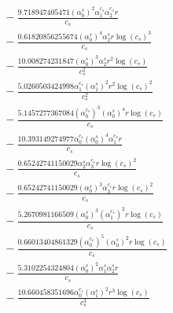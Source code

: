 \documentclass[10pt]{article}
\begin{document}
\begin{align*}
&{}  - \frac{9.718947405471 \left(\alpha_{0}^s\right)^{2} \alpha_{1}^{c_s} \alpha_{2}^{c_s} r}{c_{s}} \\
&{}  - \frac{0.61820856255674 \left(\alpha_{0}^s\right)^{4} \alpha_{2}^s r \log{\left(c_{s} \right)}^{3}}{c_{s}} \\
&{}  - \frac{10.008274231847 \left(\alpha_{0}^s\right)^{3} \alpha_{2}^s r^{2} \log{\left(c_{s} \right)}}{c_{s}^{2}} \\
&{}  - \frac{5.0260503424998 \alpha_{1}^{c_s} \left(\alpha_{1}^s\right)^{2} r^{2} \log{\left(c_{s} \right)}^{2}}{c_{s}^{2}} \\
&{}  - \frac{5.1457277367084 \left(\alpha_{0}^{c_s}\right)^{3} \left(\alpha_{0}^s\right)^{4} r \log{\left(c_{s} \right)}}{c_{s}} \\
&{}  - \frac{10.393149274977 \alpha_{0}^{c_s} \left(\alpha_{0}^s\right)^{4} \alpha_{1}^{c_s} r}{c_{s}} \\
&{}  - \frac{0.65242741150029 \alpha_{2}^s \alpha_{3}^{c_s} r \log{\left(c_{s} \right)}^{2}}{c_{s}} \\
&{}  - \frac{0.65242741150029 \left(\alpha_{0}^s\right)^{3} \alpha_{3}^{c_s} r \log{\left(c_{s} \right)}^{2}}{c_{s}} \\
&{}  - \frac{5.2670981166509 \left(\alpha_{0}^s\right)^{3} \left(\alpha_{1}^{c_s}\right)^{2} r \log{\left(c_{s} \right)}}{c_{s}} \\
&{}  - \frac{0.66013404861329 \left(\alpha_{0}^{c_s}\right)^{5} \left(\alpha_{0}^s\right)^{2} r \log{\left(c_{s} \right)}}{c_{s}} \\
&{}  - \frac{5.3102254324804 \left(\alpha_{0}^s\right)^{2} \alpha_{1}^s \alpha_{2}^s r}{c_{s}} \\
&{}  - \frac{10.660458351696 \alpha_{0}^{c_s} \left(\alpha_{1}^s\right)^{2} r^{3} \log{\left(c_{s} \right)}}{c_{s}^{3}}
\end{align*}
\end{document}
